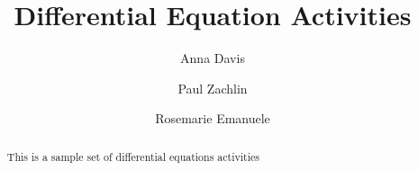 \documentclass{xourse}
\author{Anna Davis \and Paul Zachlin \and Rosemarie Emanuele}
\title{Differential Equation Activities} \license{CC-BY 4.0}
\begin{document}
\begin{abstract}
 This is a sample set of differential equations activities
\end{abstract}
\maketitle

\end{document}
